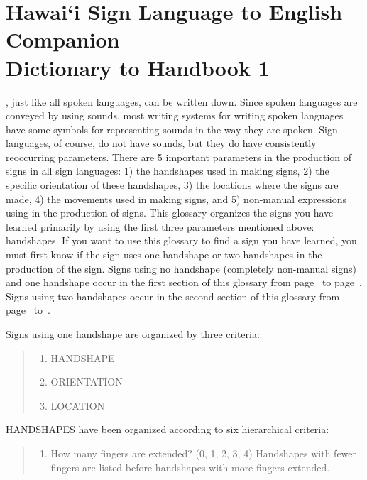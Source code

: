\documentclass{tufte-book}
\begin{document}

\chapter[Hawai`i Sign Language to English Mini-Dictionary]{Hawai`i Sign Language to English Companion \\Dictionary to Handbook 1}

\begin{fullwidth}

, just like all spoken languages, can be written down. Since spoken languages are conveyed by using sounds, most writing systems for writing spoken languages have some symbols for representing sounds in the way they are spoken. Sign languages, of course, do not have sounds, but they do have consistently reoccurring parameters. There are 5 important parameters in the production of signs in all sign languages: 1) the handshapes used in making signs, 2) the specific orientation of these handshapes, 3) the locations where the signs are made, 4) the movements used in making signs, and 5) non-manual expressions using in the production of signs.
This glossary organizes the signs you have learned primarily by using the first three parameters mentioned above: handshapes. If you want to use this glossary to find a sign you have learned, you must first know if the sign uses one handshape or two handshapes in the production of the sign. Signs using no handshape (completely non-manual signs) and one handshape occur in the first section of this glossary from page~\pageref{page:beginonehand} to page~\pageref{page:endonehand}. Signs using two handshapes occur in the second section of this glossary from page~\pageref{page:begintwohand} to~\pageref{page:endtwohand}.

Signs using one handshape are organized by three criteria:
\begin{quote}
\begin{enumerate}
\item HANDSHAPE
\item ORIENTATION
\item LOCATION
\end{enumerate}
\end{quote}

HANDSHAPES have been organized according to six hierarchical criteria:
\begin{quote}
\begin{enumerate}
\item How many fingers are extended? (0, 1, 2, 3, 4) Handshapes with fewer fingers are listed before handshapes with more fingers extended.


\end{enumerate}
\end{quote}
\end{fullwidth}
\end{document}
